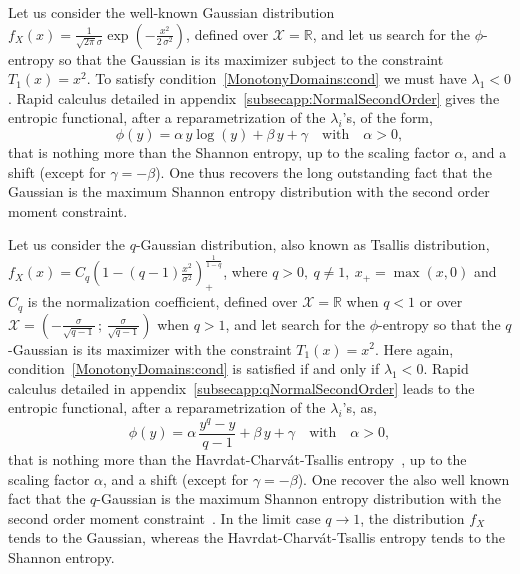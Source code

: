 \documentclass[entropy,article,submit,moreauthors,pdftex]{Definitions/mdpi}
\newcounter{GaussExample}%
\newcounter{qGaussExample}%
\newcommand{\SZ}[1]{{\color{blue} #1}}                                       %
\def\Rset{\mathbb{R}}%
\def\X{\mathcal{X}}%
\begin{document}
\begin{Example}\label{Gauss:ex}\setcounter{GaussExample}{\value{example}}
  Let   us   consider   the   well-known   Gaussian   distribution   $f_X(x)   =
  \frac{1}{\sqrt{2 \pi} \sigma} \exp\left( - \frac{x^2}{2 \, \sigma^2} \right)$,
  defined over $\X  = \Rset$, and let  us search for the  $\phi$-entropy so that
  the Gaussian  is its maximizer subject  to the constraint $T_1(x)  = x^2$.  To
  satisfy  condition~\ref{MonotonyDomains:cond} we  must have  $\lambda_1 <  0$.
  Rapid  calculus  \SZ{detailed  in  appendix~\ref{subsecapp:NormalSecondOrder}}
  gives the entropic functional, after a reparametrization of the $\lambda_i$'s,
  of the  form, $$\phi(y)  = \alpha \,  y \log(y)  + \beta \,  y +  \gamma \quad
  \mbox{with} \quad \alpha > 0,$$ that is nothing more than the Shannon entropy,
  up to the scaling factor $\alpha$, and a shift (except for $\gamma = -\beta$).
  One thus recovers  the long outstanding fact that the  Gaussian is the maximum
  Shannon entropy distribution with the second order moment constraint.
\end{Example}
%
\begin{Example}\label{qGauss:ex}\setcounter{qGaussExample}{\value{example}}
   Let  us  consider  the  $q$-Gaussian  distribution,  also  known  as  Tsallis
   distribution,   $f_X(x)  =   C_q  \left(   1  -   (q-1)  \frac{x^2}{\sigma^2}
   \right)_+^{\frac{1}{1-q}}$, where $q > 0, \: q \ne 1, \: x_+ = \max(x,0)$ and
   $C_q$ is the normalization coefficient, \SZ{defined over $\X = \Rset$ when $q
     <  1$   or  over  $\X  =   \left(  -  \frac{\sigma}{\sqrt{q-1}}  \,   ;  \,
     \frac{\sigma}{\sqrt{q-1}} \right) $  when $q > 1$}, and let  search for the
   $\phi$-entropy so that the $q$-Gaussian  is its maximizer with the constraint
   $T_1(x)   =  x^2$.    Here  again,   condition~\ref{MonotonyDomains:cond}  is
   satisfied if  and only if  $\lambda_1 <  0$.  Rapid calculus  \SZ{detailed in
     appendix~\ref{subsecapp:qNormalSecondOrder}}   leads    to   the   entropic
   functional, after a  reparametrization of the $\lambda_i$'s,  as, $$\phi(y) =
   \alpha \,  \frac{y^q-y}{q-1} + \beta  \, y  + \gamma \quad  \mbox{with} \quad
   \alpha  >  0,$$  that  is nothing  more  than  the  Havrdat-Charv\'at-Tsallis
   entropy~\cite{HavCha67,  Dar70, Tsa88,  CosHer03}, up  to the  scaling factor
   $\alpha$, and a  shift (except for $\gamma = -\beta$).   One recover the also
   well  known  fact  that  the  $q$-Gaussian is  the  maximum  Shannon  entropy
   distribution with the second order moment constraint~\cite{CosHer03}.  In the
   limit case $q  \to 1$, the distribution $f_X$ tends  to the Gaussian, whereas
   the Havrdat-Charv\'at-Tsallis entropy tends to the Shannon entropy.
\end{Example}
\end{document}
